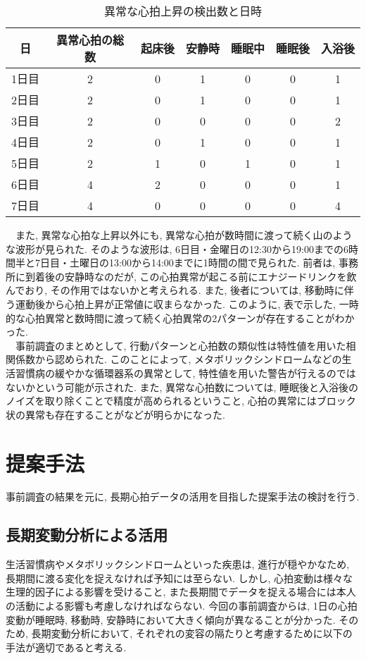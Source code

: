 \documentclass[report, 11pt, a4paper]{jsbook}
\begin{document}
\begin{table}[H]
\centering
\caption{異常な心拍上昇の検出数と日時}
\begin{tabular}{ccccccc}
\hline
日  & 異常心拍の総数 & 起床後 & 安静時 & 睡眠中 & 睡眠後 & 入浴後 \\ \hline
1日目 & 2       & 0   & 1   & 0   & 0   & 1   \\
2日目 & 2       & 0   & 1   & 0   & 0   & 1   \\
3日目 & 2       & 0   & 0   & 0   & 0   & 2   \\
4日目 & 2       & 0   & 1   & 0   & 0   & 1   \\
5日目 & 2       & 1   & 0   & 1   & 0   & 1   \\
6日目 & 4       & 2   & 0   & 0   & 0   & 1   \\
7日目 & 4       & 0   & 0   & 0   & 0   & 4   \\ \hline
\end{tabular}
\end{table}

　また, 異常な心拍な上昇以外にも, 異常な心拍が数時間に渡って続く山のような波形が見られた. そのような波形は, 6日目・金曜日の12:30から19:00までの6時間半と7日目・土曜日の13:00から14:00までに1時間の間で見られた. 前者は, 事務所に到着後の安静時なのだが, この心拍異常が起こる前にエナジードリンクを飲んでおり, その作用ではないかと考えられる. また, 後者については, 移動時に伴う運動後から心拍上昇が正常値に収まらなかった. このように, 表で示した, 一時的な心拍異常と数時間に渡って続く心拍異常の2パターンが存在することがわかった.\\

　事前調査のまとめとして, 行動パターンと心拍数の類似性は特性値を用いた相関係数から認められた. このことによって, メタボリックシンドロームなどの生活習慣病の緩やかな循環器系の異常として, 特性値を用いた警告が行えるのではないかという可能が示された. また, 異常な心拍数については, 睡眠後と入浴後のノイズを取り除くことで精度が高められるということ, 心拍の異常にはブロック状の異常も存在することがなどが明らかになった.
　

\chapter{提案手法}
事前調査の結果を元に, 長期心拍データの活用を目指した提案手法の検討を行う. 

\section{長期変動分析による活用}
生活習慣病やメタボリックシンドロームといった疾患は, 進行が穏やかなため, 長期間に渡る変化を捉えなければ予知には至らない. しかし, 心拍変動は様々な生理的因子による影響を受けること, また長期間でデータを捉える場合には本人の活動による影響も考慮しなければならない. 今回の事前調査からは, 1日の心拍変動が睡眠時, 移動時, 安静時において大きく傾向が異なることが分かった. そのため, 長期変動分析において, それぞれの変容の隔たりと考慮するために以下の手法が適切であると考える.
\end{document}
